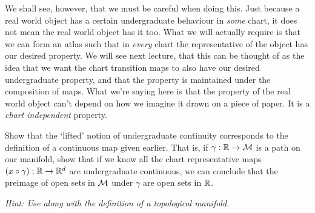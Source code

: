 We shall see, however, that we must be careful when doing this. Just because a real world object has a certain undergraduate behaviour in \textit{some} chart, it does not mean the real world object has it too. What we will actually require is that we can form an atlas such that in \textit{every} chart the representative of the object has our desired property. We will see next lecture, that this can be thought of as the idea that we want the chart transition maps to also have our desired undergraduate property, and that the property is maintained under the composition of maps. What we're saying here is that the property of the real world object can't depend on how we imagine it drawn on a piece of paper. It is a \textit{chart independent} property. 

\bbox
    Show that the `lifted' notion of undergraduate continuity corresponds to the definition of a continuous map given earlier. That is, if $\gamma:\mathbb{R}\to\mathcal{M}$ is a path on our manifold, show that if we know all the chart representative maps $(x\circ \gamma):\mathbb{R}\to \mathbb{R}^d$ are undergraduate continuous, we can conclude that the preimage of open sets in $\mathcal{M}$ under $\gamma$ are open sets in $\mathbb{R}$. 
    
    \textit{Hint: Use  along with the definition of a topological manifold.}
\ebox  